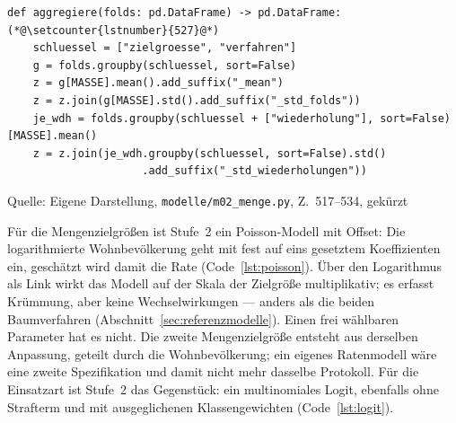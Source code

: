 \documentclass[12pt,a4paper]{article}
\newcommand{\tabquelle}[1][Eigene Darstellung]{%
  \par\setlength{\parskip}{0pt}\vspace{3pt}%
  {\setstretch{1}\fontsize{9pt}{11pt}\selectfont\raggedright Quelle: #1\par}%
}
\begin{document}
\begin{quellcode}[htbp]
\caption{Zweistufiges Mitteln: erst je Wiederholung, dann darüber}
\label{lst:mittelung}\vspace{-3.5pt}
\begin{lstlisting}[style=pythonstil,firstnumber=517]
def aggregiere(folds: pd.DataFrame) -> pd.DataFrame:(*@\setcounter{lstnumber}{527}@*)
    schluessel = ["zielgroesse", "verfahren"]
    g = folds.groupby(schluessel, sort=False)
    z = g[MASSE].mean().add_suffix("_mean")
    z = z.join(g[MASSE].std().add_suffix("_std_folds"))
    je_wdh = folds.groupby(schluessel + ["wiederholung"], sort=False)[MASSE].mean()
    z = z.join(je_wdh.groupby(schluessel, sort=False).std()
                     .add_suffix("_std_wiederholungen"))
\end{lstlisting}
\tabquelle[Eigene Darstellung, \texttt{modelle/m02\_menge.py}, Z.~517--534, gekürzt]
\end{quellcode}
 
Für die Mengenzielgrößen ist Stufe~2 ein Poisson-Modell mit Offset: Die
logarithmierte Wohnbevölkerung geht mit fest auf eins gesetztem Koeffizienten
ein, geschätzt wird damit die Rate (Code~\ref{lst:poisson}). Über den
Logarithmus als Link wirkt das Modell auf der Skala der Zielgröße
multiplikativ; es erfasst Krümmung, aber keine Wechselwirkungen --- anders als
die beiden Baumverfahren (Abschnitt~\ref{sec:referenzmodelle}). Einen frei wählbaren
Parameter hat es nicht. Die zweite Mengenzielgröße entsteht aus derselben
Anpassung, geteilt durch die Wohnbevölkerung; ein eigenes Ratenmodell wäre eine
zweite Spezifikation und damit nicht mehr dasselbe Protokoll. Für die
Einsatzart ist Stufe~2 das Gegenstück: ein multinomiales Logit, ebenfalls ohne
Strafterm und mit ausgeglichenen Klassengewichten (Code~\ref{lst:logit}).
 
\end{document}
